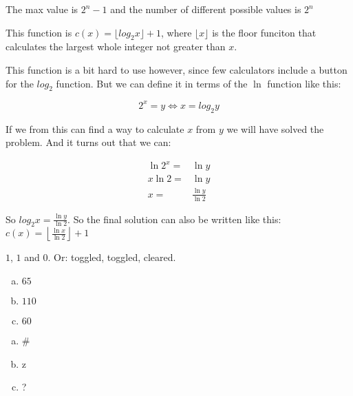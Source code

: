 \begin{Answer}[ref={n-bits-max-val}]
  The max value is $2^n - 1$ and the number of different possible
  values is $2^n$
\end{Answer}

\begin{Answer}[ref={count-bits-func}]
  This function is $c(x) = \lfloor log_2 x \rfloor + 1$, where $\lfloor
  x \rfloor$ is the floor funciton that calculates the largest whole
  integer not greater than $x$.

  This function is a bit hard to use however, since few calculators
  include a button for the $log_2$ function. But we can define it in
  terms of the $\ln$ function like this:

  \begin{equation*}
    2^x = y \iff x = log_2 y
  \end{equation*}

  If we from this can find a way to calculate $x$ from $y$ we will
  have solved the problem. And it turns out that we can:

  \begin{align*}
    \ln 2^x = & \ln y \\
    x \ln 2 = & \ln y \\
    x = & \frac{\ln y}{\ln 2}
  \end{align*}

  So $log_2 x = \frac{\ln y}{\ln 2}$. So the final solution can also be
  written like this: $c(x) = \left\lfloor \frac{\ln x}{\ln 2} \right\rfloor + 1$

\end{Answer}

\begin{Answer}[ref={bits-value-order}]
  $1$, $1$ and $0$. Or: toggled, toggled, cleared.

\end{Answer}

\begin{Answer}[ref={ascii-to-num}]

  \begin{enumerate}[(a)]
  \item $65$
  \item $110$
  \item $60$
  \end{enumerate}

\end{Answer}

\begin{Answer}[ref={num-to-ascii}]

  \begin{enumerate}[(a)]
  \item \#
  \item z
  \item ?
  \end{enumerate}

\end{Answer}

